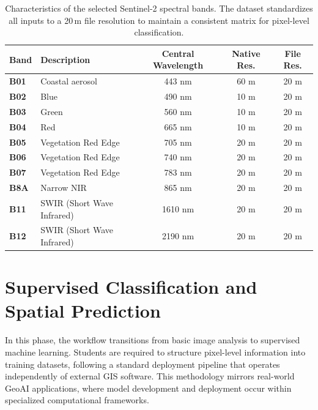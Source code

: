 \documentclass{article}
\begin{document}
\begin{table}[htbp]
    \centering
    \caption{Characteristics of the selected Sentinel-2 spectral bands. The dataset standardizes all inputs to a 20\,m file resolution to maintain a consistent matrix for pixel-level classification.}
    \vspace{0.5em}
    \renewcommand{\arraystretch}{1.3}
    \begin{tabularx}{\textwidth}{l X c c c}
        \toprule
        \textbf{Band} & \textbf{Description} & \textbf{Central Wavelength} & \textbf{Native Res.} & \textbf{File Res.} \\
        \midrule
        \textbf{B01} & Coastal aerosol              & 443 nm  & 60 m & 20 m \\
        \textbf{B02} & Blue                         & 490 nm  & 10 m & 20 m \\
        \textbf{B03} & Green                        & 560 nm  & 10 m & 20 m \\
        \textbf{B04} & Red                          & 665 nm  & 10 m & 20 m \\
        \textbf{B05} & Vegetation Red Edge          & 705 nm  & 20 m & 20 m \\
        \textbf{B06} & Vegetation Red Edge          & 740 nm  & 20 m & 20 m \\
        \textbf{B07} & Vegetation Red Edge          & 783 nm  & 20 m & 20 m \\
        \textbf{B8A} & Narrow NIR                   & 865 nm  & 20 m & 20 m \\
        \textbf{B11} & SWIR (Short Wave Infrared)   & 1610 nm & 20 m & 20 m \\
        \textbf{B12} & SWIR (Short Wave Infrared)   & 2190 nm & 20 m & 20 m \\
        \bottomrule
    \end{tabularx}
    \label{tab:bands}
\end{table}

\section{Supervised Classification and Spatial Prediction}
In this phase, the workflow transitions from basic image analysis to supervised machine learning. Students are required to structure pixel-level information into training datasets, following a standard deployment pipeline that operates independently of external GIS software. This methodology mirrors real-world GeoAI applications, where model development and deployment occur within specialized computational frameworks.
\end{document}
